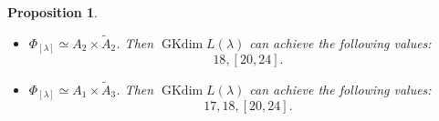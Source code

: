 \documentclass[reqno,12pt]{amsart}
\numberwithin{equation}{section}
\theoremstyle{plain}
\newtheorem{Prop}[Thm]{Proposition}
\theoremstyle{definition}
\newcommand{\lam}{\lambda}
\newcommand{\Ann}{\mathrm{Ann}}
\newcommand{\gkd}{\operatorname{GKdim}}
\begin{document}
\begin{Prop}
\begin{itemize}


  \item[(2)] $\Phi_{[\lam]}\simeq A_2\times \tilde{A}_2$. Then
$ \gkd L(\lam) $ can achieve the following values:
$$18,[20,24].$$

  \item[(3)] $\Phi_{[\lam]}\simeq A_1\times \tilde{A}_3$. Then
$ \gkd L(\lam) $ can achieve the following values:
$$17, 18, [20, 24].$$














    





    

\end{itemize}
\end{Prop}
\end{document}
